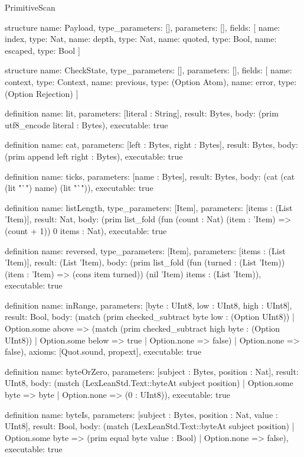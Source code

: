 \begin{lexlean}{PrimitiveScan}
\begin{semanticmodule}
structure{
  name: Payload,
  type_parameters: [],
  parameters: [],
  fields: [
    {name: index, type: Nat},
    {name: depth, type: Nat},
    {name: quoted, type: Bool},
    {name: escaped, type: Bool}
  ]
}

structure{
  name: CheckState,
  type_parameters: [],
  parameters: [],
  fields: [
    {name: context, type: Context},
    {name: previous, type: (Option Atom)},
    {name: error, type: (Option Rejection)}
  ]
}

definition{
  name: lit,
  parameters: [literal : String],
  result: Bytes,
  body: (prim utf8_encode literal : Bytes),
  executable: true
}

definition{
  name: cat,
  parameters: [left : Bytes, right : Bytes],
  result: Bytes,
  body: (prim append left right : Bytes),
  executable: true
}

definition{
  name: ticks,
  parameters: [name : Bytes],
  result: Bytes,
  body: (cat (cat (lit "`") name) (lit "`")),
  executable: true
}

definition{
  name: listLength,
  type_parameters: [Item],
  parameters: [items : (List 'Item)],
  result: Nat,
  body: (prim list_fold (fun (count : Nat) (item : 'Item) => (count + 1)) 0 items : Nat),
  executable: true
}

definition{
  name: reversed,
  type_parameters: [Item],
  parameters: [items : (List 'Item)],
  result: (List 'Item),
  body: (prim list_fold (fun (turned : (List 'Item)) (item : 'Item) => (cons item turned)) (nil 'Item) items : (List 'Item)),
  executable: true
}

definition{
  name: inRange,
  parameters: [byte : UInt8, low : UInt8, high : UInt8],
  result: Bool,
  body: (match (prim checked_subtract byte low : (Option UInt8))
    | Option.some above => (match (prim checked_subtract high byte : (Option UInt8))
      | Option.some below => true
      | Option.none => false)
    | Option.none => false),
  axioms: [Quot.sound, propext],
  executable: true
}

definition{
  name: byteOrZero,
  parameters: [subject : Bytes, position : Nat],
  result: UInt8,
  body: (match (LexLeanStd.Text::byteAt subject position)
    | Option.some byte => byte
    | Option.none => (0 : UInt8)),
  executable: true
}

definition{
  name: byteIs,
  parameters: [subject : Bytes, position : Nat, value : UInt8],
  result: Bool,
  body: (match (LexLeanStd.Text::byteAt subject position)
    | Option.some byte => (prim equal byte value : Bool)
    | Option.none => false),
  executable: true
}


\end{semanticmodule}
\end{lexlean}
